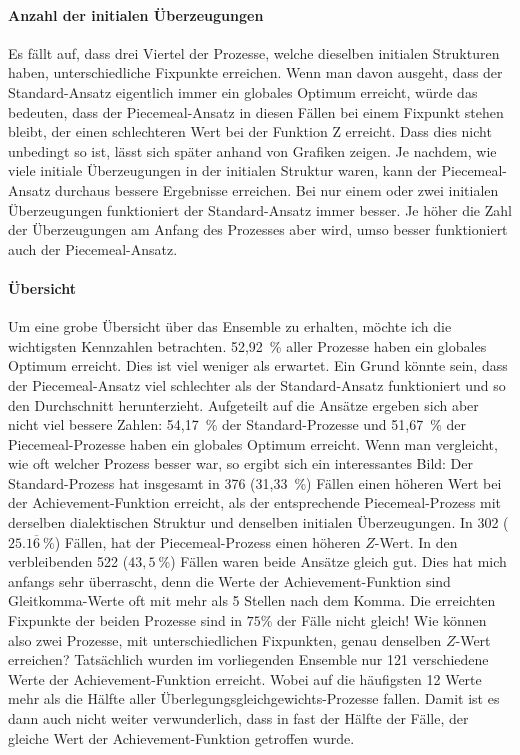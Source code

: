 \documentclass{article}
\begin{document}
\paragraph{Anzahl der initialen Überzeugungen} Es fällt auf, dass drei Viertel der Prozesse, welche dieselben initialen Strukturen haben, unterschiedliche Fixpunkte erreichen. Wenn man davon ausgeht, dass der Standard-Ansatz eigentlich immer ein globales Optimum erreicht, würde das bedeuten, dass der Piecemeal-Ansatz in diesen Fällen bei einem Fixpunkt stehen bleibt, der einen schlechteren Wert bei der Funktion Z erreicht. Dass dies nicht unbedingt so ist, lässt sich später anhand von Grafiken zeigen. Je nachdem, wie viele initiale Überzeugungen in der initialen Struktur waren, kann der Piecemeal-Ansatz durchaus bessere Ergebnisse erreichen. Bei nur einem oder zwei initialen Überzeugungen funktioniert der Standard-Ansatz immer besser. Je höher die Zahl der Überzeugungen am Anfang des Prozesses aber wird, umso besser funktioniert auch der Piecemeal-Ansatz.

\paragraph{Übersicht} Um eine grobe Übersicht über das Ensemble zu erhalten, möchte ich die wichtigsten Kennzahlen betrachten. 52,92~\% aller Prozesse haben ein globales Optimum erreicht. Dies ist viel weniger als erwartet. Ein Grund könnte sein, dass der Piecemeal-Ansatz viel schlechter als der Standard-Ansatz funktioniert und so den Durchschnitt herunterzieht. Aufgeteilt auf die Ansätze ergeben sich aber nicht viel bessere Zahlen: 54,17~\% der Standard-Prozesse und 51,67~\% der Piecemeal-Prozesse haben ein globales Optimum erreicht. Wenn man vergleicht, wie oft welcher Prozess besser war, so ergibt sich ein interessantes Bild: Der Standard-Prozess hat insgesamt in 376 (31,33~\%) Fällen einen höheren Wert bei der Achievement-Funktion erreicht, als der entsprechende Piecemeal-Prozess mit derselben dialektischen Struktur und denselben initialen Überzeugungen. In 302 ($25.1\overline{6}~\%$) Fällen, hat der Piecemeal-Prozess einen höheren $Z$-Wert. In den verbleibenden 522 ($43,5~\%$) Fällen waren beide Ansätze gleich gut. Dies hat mich anfangs sehr überrascht, denn die Werte der Achievement-Funktion sind Gleitkomma-Werte oft mit mehr als 5 Stellen nach dem Komma. Die erreichten Fixpunkte der beiden Prozesse sind in $75\%$ der Fälle nicht gleich! Wie können also zwei Prozesse, mit unterschiedlichen Fixpunkten, genau denselben $Z$-Wert erreichen? Tatsächlich wurden im vorliegenden Ensemble nur 121 verschiedene Werte der Achievement-Funktion erreicht. Wobei auf die häufigsten 12 Werte mehr als die Hälfte aller Überlegungsgleichgewichts-Prozesse fallen. Damit ist es dann auch nicht weiter verwunderlich, dass in fast der Hälfte der Fälle, der gleiche Wert der Achievement-Funktion getroffen wurde.
\end{document}
